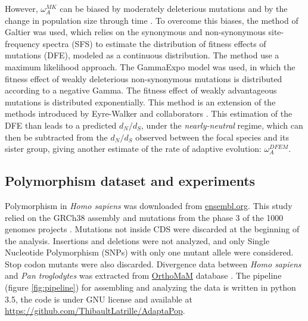 \documentclass[10pt]{article}
\begin{document}
\begin{multicols}{2}
	However, $\omega_A^{MK}$ can be biased by moderately deleterious mutations \cite{eyre-walker_quantifying_2002} and by the change in population size through time \cite{eyre-walker_changing_2002}. To overcome this biases, the method of Galtier \cite{galtier_adaptive_2016} was used, which relies on the synonymous and non-synonymous site-frequency spectra (SFS) to estimate the distribution of fitness effects of mutations (DFE), modeled as a continuous distribution. The method use a maximum likelihood approach. The GammaExpo model was used, in which the fitness effect of weakly deleterious non-synonymous mutations is distributed according to a negative Gamma. The fitness effect of weakly advantageous mutations is distributed exponentially. This method is an extension of the methods introduced by Eyre-Walker and collaborators \cite{eyre-walker_distribution_2006, eyre-walker_estimating_2009}. This estimation of the DFE than leads to a predicted $d_N/d_S$, under the \textit{nearly-neutral} regime, which can then be subtracted from the $d_N/d_S$ observed between the focal species and its sister group, giving another estimate of the rate of adaptive evolution: $\omega_A^{DFEM}$.
	\subsection*{Polymorphism dataset and experiments}

	Polymorphism in \textit{Homo sapiens} was downloaded from \href{http://www.ensembl.org/index.html}{ensembl.org}. This study relied on the GRCh38 assembly and mutations from the phase 3 of the 1000 genomes projects \cite{consortium_integrated_2012, the_1000_genomes_project_consortium_global_2015}. Mutations not inside CDS were discarded at the beginning of the analysis. Insertions and deletions were not analyzed, and only Single Nucleotide Polymorphism (SNPs) with only one mutant allele were considered. Stop codon mutants were also discarded. Divergence data between \textit{Homo sapiens} and \textit{Pan troglodytes} was extracted from \href{http://www.orthomam.univ-montp2.fr}{OrthoMaM} database \cite{ranwez_orthomam:_2007, douzery_orthomam_2014}. The pipeline (figure \ref{fig:pipeline}) for assembling and analyzing the data is written in python 3.5, the code is under GNU license and available at \href{https://github.com/ThibaultLatrille/AdaptaPop}{https://github.com/ThibaultLatrille/AdaptaPop}. \\
	

\end{multicols}
\end{document}
